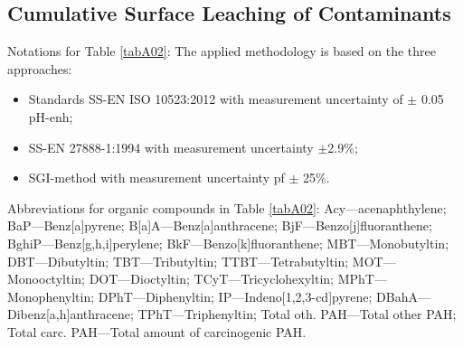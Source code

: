 \documentclass[algorithms,article,accept,pdftex,moreauthors]{Definitions/mdpi}
\begin{document}
\subsection[\appendixname~\thesubsection]{Cumulative Surface Leaching of Contaminants}

Notations for Table \ref{tabA02}: The applied methodology is based on the three approaches: 

\begin{itemize}
    \item Standards SS-EN ISO 10523:2012 with measurement uncertainty of $\pm$ 0.05 pH-enh;
    \item SS-EN 27888-1:1994 with measurement uncertainty $\pm$2.9\%;
    \item SGI-method with measurement uncertainty pf $\pm$ 25\%.
\end{itemize}

Abbreviations for organic compounds in Table \ref{tabA02}: Acy---acenaphthylene; \linebreak BaP---Benz[a]pyrene; B[a]A---Benz[a]anthracene; BjF---Benzo[j]fluoranthene; \linebreak BghiP---Benz[g,h,i]perylene; BkF---Benzo[k]fluoranthene; MBT---Monobutyltin; DBT---Dibutyltin; TBT---Tributyltin; TTBT---Tetrabutyltin; MOT---Monooctyltin; DOT---Dioctyltin; TCyT---Tricyclohexyltin; MPhT---Monophenyltin; DPhT---Diphenyltin; IP---Indeno[1,2,3-cd]pyrene; DBahA---Dibenz[a,h]anthracene; TPhT---Triphenyltin; Total oth. PAH---Total other PAH; Total carc. PAH---Total amount of carcinogenic PAH. 
\end{document}
